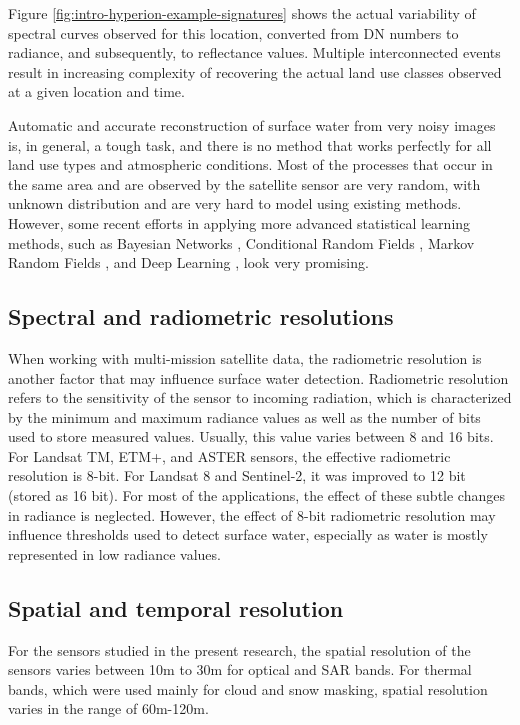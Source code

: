 Figure \ref{fig:intro-hyperion-example-signatures} shows the actual variability of spectral curves observed for this location, converted from DN numbers to radiance, and subsequently, to reflectance values. Multiple interconnected events result in increasing complexity of recovering the actual land use classes observed at a given location and time.

Automatic and accurate reconstruction of surface water from very noisy images is, in general, a tough task, and there is no method that works perfectly for all land use types and atmospheric conditions. Most of the processes that occur in the same area and are observed by the satellite sensor are very random, with unknown distribution and are very hard to model using existing methods. However, some recent efforts in applying more advanced statistical learning methods, such as Bayesian Networks \citet{mello2013bayesian}, Conditional Random Fields \citet{hoberg2015conditional}, Markov Random Fields \citet{elmi2016dynamic}, and Deep Learning \citet{chen2014deep}, look very promising.

\subsection{Spectral and radiometric resolutions}

When working with multi-mission satellite data, the radiometric resolution is another factor that may influence surface water detection. Radiometric resolution refers to the sensitivity of the sensor to incoming radiation, which is characterized by the minimum and maximum radiance values as well as the number of bits used to store measured values. Usually, this value varies between 8 and 16 bits. For Landsat TM, ETM+, and ASTER sensors, the effective radiometric resolution is 8-bit. For Landsat 8 and Sentinel-2, it was improved to 12 bit (stored as 16 bit). For most of the applications, the effect of these subtle changes in radiance is neglected. However, the effect of 8-bit radiometric resolution may influence thresholds used to detect surface water, especially as water is mostly represented in low radiance values.

\subsection{Spatial and temporal resolution}
For the sensors studied in the present research, the spatial resolution of the sensors varies between 10m to 30m for optical and \gls{SAR} bands. For thermal bands, which were used mainly for cloud and snow masking, spatial resolution varies in the range of 60m-120m. 

